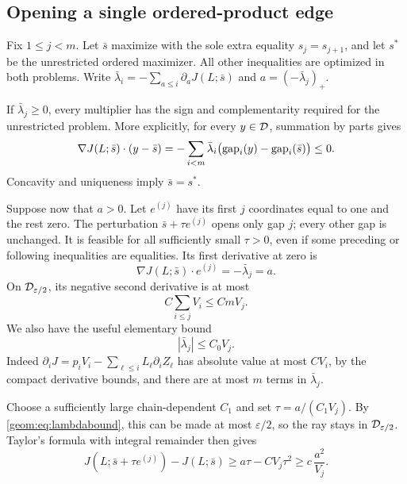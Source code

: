 \subsection{Opening a single ordered-product edge}

Fix \(1\le j<m\).  Let \(\bar s\) maximize with the sole extra equality
\(s_j=s_{j+1}\), and let \(s^*\) be the unrestricted ordered maximizer.
All other inequalities are optimized in both problems.
Write \(\bar\lambda_i=-\sum_{a\le i}\partial_aJ(L;\bar s)\) and
\(a=(-\bar\lambda_j)_+\).

If \(\bar\lambda_j\ge0\), every multiplier has the sign and
complementarity required for the unrestricted problem.  More explicitly,
for every \(y\in\mathcal D\), summation by parts gives
\[
 \nabla J(L;\bar s)\cdot(y-\bar s)
   =-\sum_{i<m}\bar\lambda_i
                  \bigl(\operatorname{gap}_i(y)-\operatorname{gap}_i(\bar s)\bigr)\le0.
\]
Concavity and uniqueness imply \(\bar s=s^*\).

Suppose now that \(a>0\).  Let \(e^{(j)}\) have its first \(j\)
coordinates equal to one and the rest zero.  The perturbation
\(\bar s+\tau e^{(j)}\) opens only gap \(j\); every other gap is
unchanged.  It is feasible for all sufficiently small \(\tau>0\),
even if some preceding or following inequalities are equalities.
Its first derivative at zero is
\[
 \nabla J(L;\bar s)\cdot e^{(j)}=-\bar\lambda_j=a.
\]
On \(\mathcal D_{\varepsilon/2}\), its negative second derivative is at most
\[
 C\sum_{i\le j}V_i\le CmV_j.
\]
We also have the useful elementary bound
\begin{equation}
 |\bar\lambda_j|\le C_0V_j.                       \label{geom:eq:lambdabound}
\end{equation}
Indeed
\(\partial_iJ=p_iV_i-\sum_{\ell\le i}L_\ell\partial_iZ_\ell\)
has absolute value at most \(CV_i\), by the compact derivative
bounds, and there are at most \(m\) terms in \(\bar\lambda_j\).

Choose a sufficiently large chain-dependent \(C_1\) and set
\(\tau=a/(C_1V_j)\).  By \eqref{geom:eq:lambdabound}, this can be made
at most \(\varepsilon/2\), so the ray stays in
\(\mathcal D_{\varepsilon/2}\).  Taylor's formula with integral remainder
then gives
\begin{equation}
 J(L;\bar s+\tau e^{(j)})-J(L;\bar s)
    \ge a\tau-CV_j\tau^2\ge c\,\frac{a^2}{V_j}.
                                                        \label{geom:eq:singlelower}
\end{equation}


